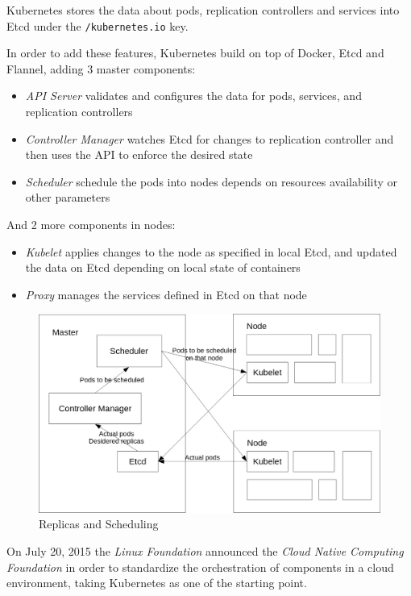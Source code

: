 Kubernetes stores the data about pods, replication controllers and services into Etcd under the \texttt{/kubernetes.io} key.

In order to add these features, Kubernetes build on top of Docker, Etcd and Flannel, adding 3 master components:

\begin{itemize}
\item \textit{API Server} validates and configures the data for pods, services, and replication controllers
\item \textit{Controller Manager} watches Etcd for changes to replication controller and then uses the API to enforce the desired state
\item \textit{Scheduler} schedule the pods into nodes depends on resources availability or other parameters
\end{itemize}

And 2 more components in nodes:

\begin{itemize}
\item \textit{Kubelet} applies changes to the node as specified in local Etcd, and updated the data on Etcd depending on local state of containers
\item \textit{Proxy} manages the services defined in Etcd on that node
\end{itemize}

\begin{figure}[htbp]
\centering
\includegraphics{media/ch5-scheduling.png}
\caption{Replicas and Scheduling}
\end{figure}

On July 20, 2015 the \textit{Linux Foundation} announced the \textit{Cloud Native Computing Foundation}\cite{CloudNativeComputingFoundation} in order to standardize the orchestration of components in a cloud environment, taking Kubernetes as one of the starting point.


